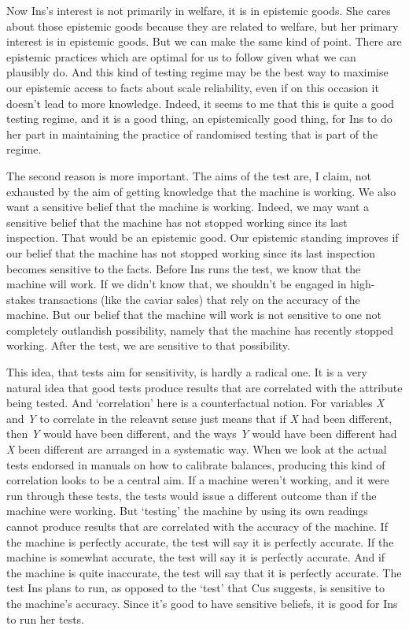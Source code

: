 \documentclass[
  10pt,
  letterpaper,
  twoside]{scrbook}
\begin{document}
Now {Ins}'s interest is not primarily in welfare, it is in epistemic
goods. She cares about those epistemic goods because they are related to
welfare, but her primary interest is in epistemic goods. But we can make
the same kind of point. There are epistemic practices which are optimal
for us to follow given what we can plausibly do. And this kind of
testing regime may be the best way to maximise our epistemic access to
facts about scale reliability, even if on this occasion it doesn't lead
to more knowledge. Indeed, it seems to me that this is quite a good
testing regime, and it is a good thing, an epistemically good thing, for
{Ins} to do her part in maintaining the practice of randomised testing
that is part of the regime.

The second reason is more important. The aims of the test are, I claim,
not exhausted by the aim of getting knowledge that the machine is
working. We also want a sensitive belief that the machine is working.
Indeed, we may want a sensitive belief that the machine has not stopped
working since its last inspection. That would be an epistemic good. Our
epistemic standing improves if our belief that the machine has not
stopped working since its last inspection becomes sensitive to the
facts. Before {Ins} runs the test, we know that the machine will work.
If we didn't know that, we shouldn't be engaged in high-stakes
transactions (like the caviar sales) that rely on the accuracy of the
machine. But our belief that the machine will work is not sensitive to
one not completely outlandish possibility, namely that the machine has
recently stopped working. After the test, we are sensitive to that
possibility.

This idea, that tests aim for sensitivity, is hardly a radical one. It
is a very natural idea that good tests produce results that are
correlated with the attribute being tested. And `correlation' here is a
counterfactual notion. For variables \emph{X} and \emph{Y} to correlate
in the releavnt sense just means that if \emph{X} had been different,
then \emph{Y} would have been different, and the ways \emph{Y} would
have been different had \emph{X} been different are arranged in a
systematic way. When we look at the actual tests endorsed in manuals on
how to calibrate balances, producing this kind of correlation looks to
be a central aim. If a machine weren't working, and it were run through
these tests, the tests would issue a different outcome than if the
machine were working. But `testing' the machine by using its own
readings cannot produce results that are correlated with the accuracy of
the machine. If the machine is perfectly accurate, the test will say it
is perfectly accurate. If the machine is somewhat accurate, the test
will say it is perfectly accurate. And if the machine is quite
inaccurate, the test will say that it is perfectly accurate. The test
{Ins} plans to run, as opposed to the `test' that {Cus} suggests, is
sensitive to the machine's accuracy. Since it's good to have sensitive
beliefs, it is good for {Ins} to run her tests.
\end{document}
